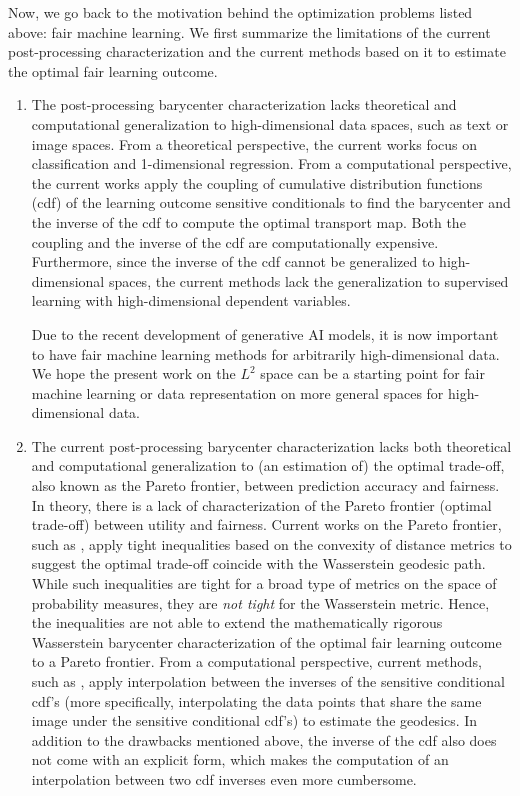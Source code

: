 \documentclass[twoside,11pt]{article}
\begin{document}
Now, we go back to the motivation behind the optimization problems listed above: fair machine learning. We first summarize the limitations of the current post-processing characterization and the current methods based on it to estimate the optimal fair learning outcome. 

\begin{enumerate}
\item The post-processing barycenter characterization lacks theoretical and computational generalization to high-dimensional data spaces, such as text or image spaces. From a theoretical perspective, the current works \cite{chzhen2020fair, gouic2020projection, silvia2020general} focus on classification and 1-dimensional regression. From a computational perspective, the current works apply the coupling of cumulative distribution functions (cdf) of the learning outcome sensitive conditionals to find the barycenter and the inverse of the cdf to compute the optimal transport map. Both the coupling and the inverse of the cdf are computationally expensive. Furthermore, since the inverse of the cdf cannot be generalized to high-dimensional spaces, the current methods lack the generalization to supervised learning with high-dimensional dependent variables.

Due to the recent development of generative AI models, it is now important to have fair machine learning methods for arbitrarily high-dimensional data. We hope the present work on the $L^2$ space can be a starting point for fair machine learning or data representation on more general spaces for high-dimensional data.

\item The current post-processing barycenter characterization lacks both theoretical and computational generalization to (an estimation of) the optimal trade-off, also known as the Pareto frontier, between prediction accuracy and fairness. In theory, there is a lack of characterization of the Pareto frontier (optimal trade-off) between utility and fairness. Current works on the Pareto frontier, such as \cite{silvia2020general}, apply tight inequalities based on the convexity of distance metrics to suggest the optimal trade-off coincide with the Wasserstein geodesic path. While such inequalities are tight for a broad type of metrics on the space of probability measures, they are {\em not tight} for the Wasserstein metric. Hence, the inequalities are not able to extend the mathematically rigorous Wasserstein barycenter characterization of the optimal fair learning outcome to a Pareto frontier. From a computational perspective, current methods, such as \cite{silvia2020general}, apply interpolation between the inverses of the sensitive conditional cdf's (more specifically, interpolating the data points that share the same image under the sensitive conditional cdf's) to estimate the geodesics. In addition to the drawbacks mentioned  above, the inverse of the cdf also does not come with an explicit form, which makes the computation of an interpolation between two cdf inverses even more cumbersome.


\end{enumerate}
\end{document}

